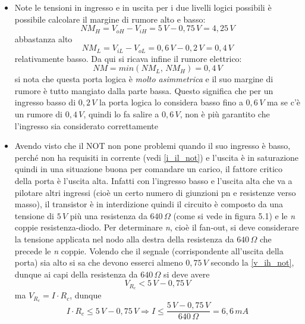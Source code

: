 \documentclass[12pt, a4paper]{report}
\begin{document}
\begin{itemize}
    \item Note le tensioni in ingresso e in uscita per i due livelli logici possibili è possibile calcolare il margine di rumore alto e basso:
    \begin{equation*}
        \textit{NM}_{H} = V_{oH} - V_{iH} = 5\,V - 0,75\,V = 4,25\,V
    \end{equation*}
    abbastanza alto
    \begin{equation*}
        \textit{NM}_{L} = V_{iL} - V_{oL} = 0,6\,V - 0,2\,V = 0,4\,V
    \end{equation*}
    relativamente basso. Da qui si ricava infine il rumore elettrico:
    \begin{equation}
        \textit{NM} = min(\textit{NM}_{L},\, \textit{NM}_{H}) = 0,4\,V
    \end{equation}
    si nota che questa porta logica è \textit{molto asimmetrica} e il suo margine di rumore è tutto mangiato dalla parte bassa. Questo significa che per un ingresso basso di $0,2\,V$ la porta logica lo considera basso fino a $0,6\,V$ ma se c'è un rumore di $0,4\,V$, quindi lo fa salire a $0,6\,V$, non è più garantito che l'ingresso sia considerato correttamente
    \item Avendo visto che il NOT non pone problemi quando il suo ingresso è basso, perché non ha requisiti in corrente (vedi \eqref{i_il_not}) e l'uscita è in saturazione quindi in una situazione buona per comandare un carico, il fattore critico della porta è l'uscita alta. Infatti con l'ingresso basso e l'uscita alta che va a pilotare altri ingressi (cioè un certo numero di giunzioni pn e resistenze verso masso), il transistor è in interdizione quindi il circuito è composto da una tensione di $5\,V$ più una resistenza da $640\,\Omega$ (come si vede in figura 5.1) e le \textit{n} coppie resistenza-diodo. Per determinare \textit{n}, cioè il fan-out, si deve considerare la tensione applicata nel nodo alla destra della resistenza da $640\,\Omega$ che precede le \textit{n} coppie. Volendo che il segnale (corrispondente all'uscita della porta) sia alto si sa che devono esserci almeno $0,75\,V$ secondo la \eqref{v_ih_not}, dunque ai capi della resistenza da $640\,\Omega$ si deve avere
    \begin{equation*}
        V_{R_{c}} < 5\,V - 0,75\,V
    \end{equation*}
    ma $V_{R_{c}} = I \cdot R_{c}$, dunque
    \begin{equation*}
        I \cdot R_{c} \leq 5\,V - 0,75\,V \Rightarrow I \leq \frac{5\,V - 0,75\,V}{640\,\Omega} = 6,6\,mA

\end{equation*}
\end{itemize}
\end{document}
